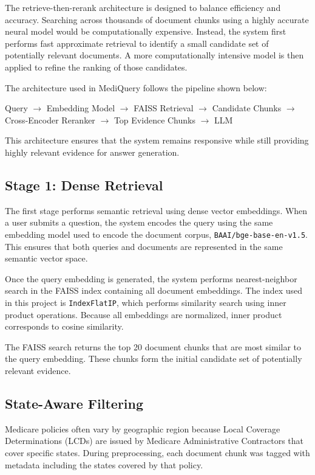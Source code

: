 \documentclass[12pt, letterpaper]{article}
\begin{document}
The retrieve-then-rerank architecture is designed to balance efficiency and accuracy. Searching across thousands of document chunks using a highly accurate neural model would be computationally expensive. Instead, the system first performs fast approximate retrieval to identify a small candidate set of potentially relevant documents. A more computationally intensive model is then applied to refine the ranking of those candidates.

The architecture used in MediQuery follows the pipeline shown below:

\begin{center}
Query $\rightarrow$ Embedding Model $\rightarrow$ FAISS Retrieval $\rightarrow$ Candidate Chunks $\rightarrow$ Cross-Encoder Reranker $\rightarrow$ Top Evidence Chunks $\rightarrow$ LLM
\end{center}

This architecture ensures that the system remains responsive while still providing highly relevant evidence for answer generation.

\subsection{Stage 1: Dense Retrieval}

The first stage performs semantic retrieval using dense vector embeddings. When a user submits a question, the system encodes the query using the same embedding model used to encode the document corpus, \texttt{BAAI/bge-base-en-v1.5}. This ensures that both queries and documents are represented in the same semantic vector space.

Once the query embedding is generated, the system performs nearest-neighbor search in the FAISS index containing all document embeddings. The index used in this project is \texttt{IndexFlatIP}, which performs similarity search using inner product operations. Because all embeddings are normalized, inner product corresponds to cosine similarity.

The FAISS search returns the top 20 document chunks that are most similar to the query embedding. These chunks form the initial candidate set of potentially relevant evidence.

\subsection{State-Aware Filtering}

Medicare policies often vary by geographic region because Local Coverage Determinations (LCDs) are issued by Medicare Administrative Contractors that cover specific states. During preprocessing, each document chunk was tagged with metadata including the states covered by that policy.
\end{document}
